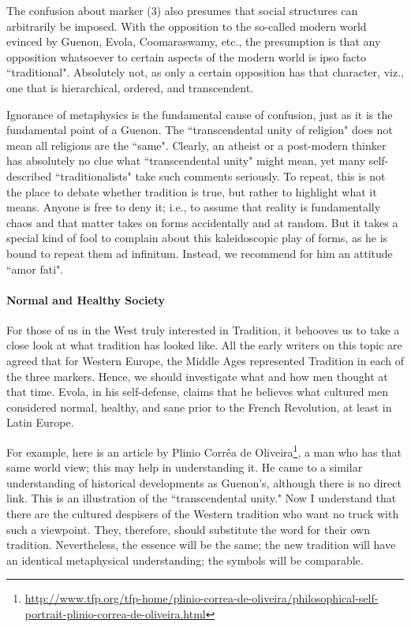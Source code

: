 The confusion about marker (3) also presumes that social structures can arbitrarily be imposed. With the opposition to
the so-called modern world evinced by Guenon, Evola, Coomaraswamy, etc., the presumption is that any opposition
whatsoever to certain aspects of the modern world is ipso facto ``traditional". Absolutely not, as only a certain
opposition has that character, viz., one that is hierarchical, ordered, and transcendent.

Ignorance of metaphysics is the fundamental cause of confusion, just as it is the fundamental point of a Guenon. The
``transcendental unity of religion" does not mean all religions are the ``same". Clearly, an atheist or a post-modern
thinker has absolutely no clue what ``transcendental unity" might mean, yet many self-described ``traditionalists" take
such comments seriously. To repeat, this is not the place to debate whether tradition is true, but rather to highlight
what it means. Anyone is free to deny it; i.e., to assume that reality is fundamentally chaos and that matter takes on
forms accidentally and at random. But it takes a special kind of fool to complain about this kaleidoscopic play of
forms, as he is bound to repeat them ad infinitum. Instead, we recommend for him an attitude ``amor fati".

\paragraph{Normal and Healthy Society}
For those of us in the West truly interested in Tradition, it behooves us to take a close look at what tradition has
looked like. All the early writers on this topic are agreed that for Western Europe, the Middle Ages represented
Tradition in each of the three markers. Hence, we should investigate what and how men thought at that time. Evola, in
his self-defense, claims that he believes what cultured men considered normal, healthy, and sane prior to the French
Revolution, at least in Latin Europe.

For example, here is an article by Plinio Corrêa de Oliveira\footnote{\url{http://www.tfp.org/tfp-home/plinio-correa-de-oliveira/philosophical-self-portrait-plinio-correa-de-oliveira.html}}, a man who has that same world view; this may help in
understanding it. He came to a similar understanding of historical developments as Guenon's,
although there is no direct link. This is an illustration of the ``transcendental unity." Now I understand that there
are the cultured despisers of the Western tradition who want no truck with such a viewpoint. They, therefore, should
substitute the word for their own tradition. Nevertheless, the essence will be the same; the new tradition will have an
identical metaphysical understanding; the symbols will be comparable.

